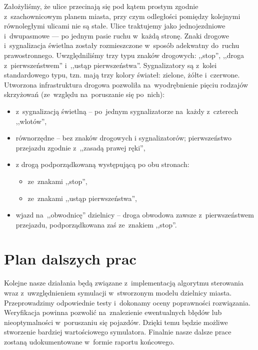 \documentclass[11pt, a4paper, twoside]{article}
\begin{document}
	Założyliśmy, że ulice przecinają się pod kątem prostym zgodnie z~szachownicowym planem miasta, przy czym odległości pomiędzy kolejnymi równoległymi ulicami nie są stałe. Ulice traktujemy jako jednojezdniowe i~dwupasmowe --- po jednym pasie ruchu w~każdą stronę. Znaki drogowe i~sygnalizacja świetlna zostały rozmieszczone w~sposób adekwatny do~ruchu prawostronnego. Uwzględniliśmy trzy typu znaków drogowych: ,,stop'', ,,droga z~pierwszeństwem'' i~,,ustąp pierwszeństwa''. Sygnalizatory są z~kolei standardowego typu, tzn. mają trzy kolory świateł: zielone, żółte i~czerwone. Utworzona infrastruktura drogowa pozwoliła na~wyodrębnienie pięciu rodzajów skrzyżowań (ze~względu na~poruszanie się po~nich):
	\begin{itemize}
		\item z~sygnalizacją świetlną -- po~jednym sygnalizatorze na~każdy z~czterech ,,wlotów'',
		\item równorzędne -- bez znaków drogowych i sygnalizatorów; pierwszeństwo przejazdu zgodnie z~,,zasadą prawej ręki'',
		\item z drogą podporządkowaną występującą po obu stronach:
		\begin{itemize}
			\item ze~znakami ,,stop'',
			\item ze~znakami ,,ustąp pierwszeństwa'',
		\end{itemize}
		\item wjazd na~,,obwodnicę'' dzielnicy -- droga obwodowa zawsze z~pierwszeństwem przejazdu, podporządkowana zaś ze~znakiem ,,stop''.
	\end{itemize}

	
	
	
	
	\section{Plan dalszych prac}
	Kolejne nasze działania będą związane z~implementacją algorytmu sterowania wraz z~uwzględnieniem symulacji w~stworzonym modelu dzielnicy miasta. Przeprowadzimy odpowiednie testy i~dokonamy oceny poprawności rozwiązania. Weryfikacja powinna pozwolić na~znalezienie ewentualnych błędów lub nieoptymalności w~poruszaniu się pojazdów. Dzięki temu będzie możliwe stworzenie bardziej wartościowego symulatora. Finalnie nasze dalsze prace zostaną udokumentowane w~formie raportu końcowego.
		
\end{document}
